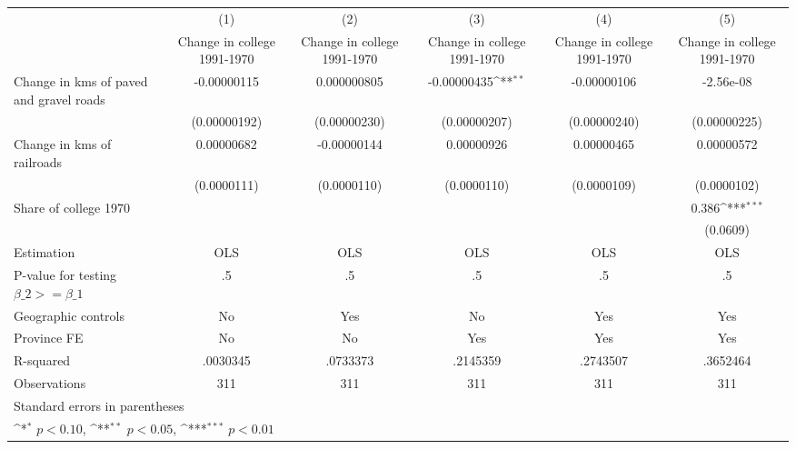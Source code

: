 {
\def\sym#1{\ifmmode^{#1}\else\(^{#1}\)\fi}
\begin{tabular}{l*{5}{c}}
\hline\hline
                    &\multicolumn{1}{c}{(1)}&\multicolumn{1}{c}{(2)}&\multicolumn{1}{c}{(3)}&\multicolumn{1}{c}{(4)}&\multicolumn{1}{c}{(5)}\\
                    &\multicolumn{1}{c}{Change in college 1991-1970}&\multicolumn{1}{c}{Change in college 1991-1970}&\multicolumn{1}{c}{Change in college 1991-1970}&\multicolumn{1}{c}{Change in college 1991-1970}&\multicolumn{1}{c}{Change in college 1991-1970}\\
\hline
Change in kms of paved and gravel roads& -0.00000115         & 0.000000805         & -0.00000435\sym{**} & -0.00000106         &   -2.56e-08         \\
                    &(0.00000192)         &(0.00000230)         &(0.00000207)         &(0.00000240)         &(0.00000225)         \\
[1em]
Change in kms of railroads&  0.00000682         & -0.00000144         &  0.00000926         &  0.00000465         &  0.00000572         \\
                    & (0.0000111)         & (0.0000110)         & (0.0000110)         & (0.0000109)         & (0.0000102)         \\
[1em]
Share of college 1970&                     &                     &                     &                     &       0.386\sym{***}\\
                    &                     &                     &                     &                     &    (0.0609)         \\
\hline
Estimation          &         OLS         &         OLS         &         OLS         &         OLS         &         OLS         \\
P-value for testing $\beta\_2 >= \beta\_1$&          .5         &          .5         &          .5         &          .5         &          .5         \\
Geographic controls &          No         &         Yes         &          No         &         Yes         &         Yes         \\
Province FE         &          No         &          No         &         Yes         &         Yes         &         Yes         \\
R-squared           &    .0030345         &    .0733373         &    .2145359         &    .2743507         &    .3652464         \\
Observations        &         311         &         311         &         311         &         311         &         311         \\
\hline\hline
\multicolumn{6}{l}{\footnotesize Standard errors in parentheses}\\
\multicolumn{6}{l}{\footnotesize \sym{*} \(p<0.10\), \sym{**} \(p<0.05\), \sym{***} \(p<0.01\)}\\
\end{tabular}
}
